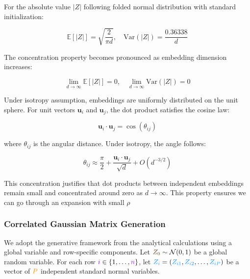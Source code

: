 \documentclass[a4paper]{article}
\theoremstyle{plain}
\theoremstyle{definition}
\theoremstyle{remark}
\begin{document}
\begin{tcolorbox}[colback=blue!10,colframe=blue!80!black,title={\textbf{High-Dimensional Embedding Concentration}},enhanced,drop shadow,boxrule=2pt]
For the absolute value $|Z|$ following folded normal distribution with standard initialization:

\begin{equation}
\boxed{\mathbb{E}[|Z|] = \sqrt{\frac{2}{\pi d}}, \quad \text{Var}(|Z|) = \frac{0.36338}{d}} \label{eq:high_dim_concentration_embeddings}
\end{equation}

The concentration property becomes pronounced as embedding dimension increases:

\begin{equation}
\boxed{\lim_{d \to \infty} \mathbb{E}[|Z|] = 0, \quad \lim_{d \to \infty} \text{Var}(|Z|) = 0} \label{eq:embedding_concentration_limit}
\end{equation}
\end{tcolorbox}

Under isotropy assumption, embeddings are uniformly distributed on the unit sphere. For unit vectors $\mathbf{u}_i$ and $\mathbf{u}_j$, the dot product satisfies the cosine law:

\begin{equation}
\boxed{\mathbf{u}_i \cdot \mathbf{u}_j = \cos(\theta_{ij})} \label{eq:cosine_law_embeddings}
\end{equation}

where $\theta_{ij}$ is the angular distance. Under isotropy, the angle follows:

\begin{equation}
\boxed{\theta_{ij} \approx \frac{\pi}{2} + \frac{\mathbf{u}_i \cdot \mathbf{u}_j}{\sqrt{d}} + O(d^{-3/2})} \label{eq:angular_concentration}
\end{equation}

This concentration justifies that dot products between independent embeddings remain small and concentrated around zero as $d \to \infty$. This property ensures we can go through an expansion with small $\rho$



\subsubsection{Correlated Gaussian Matrix Generation}

We adopt the generative framework from the analytical calculations using a \textcolor{kernelcolor}{global variable} and \textcolor{sobolevcolor}{row-specific components}. Let $\textcolor{weightcolor}{Z_0} \sim \mathcal{N}(0,1)$ be a \textcolor{kernelcolor}{global random variable}. For each row $\textcolor{k3color}{i} \in \{1, \ldots, \textcolor{methodcolor}{n}\}$, let $\textcolor{sobolevcolor}{Z_i} = (\textcolor{sobolevcolor}{Z_{i1}}, \textcolor{sobolevcolor}{Z_{i2}}, \ldots, \textcolor{sobolevcolor}{Z_{iP}})$ be a vector of $\textcolor{insightcolor}{P}$ independent standard normal variables.
\end{document}
